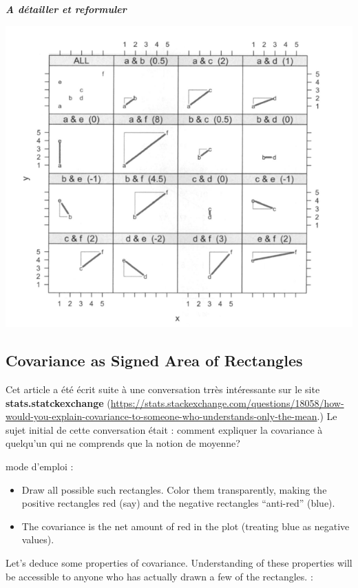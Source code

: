 \documentclass[
]{report}
\providecommand{\tightlist}{%
  \setlength{\itemsep}{0pt}\setlength{\parskip}{0pt}}
\begin{document}
\textbf{\emph{A détailler et reformuler}}

\includegraphics{hayes.PNG}

\hypertarget{covariance-as-signed-area-of-rectangles}{%
\subsection{Covariance as Signed Area of Rectangles}\label{covariance-as-signed-area-of-rectangles}}

Cet article \citep{chudzicki} a été écrit suite à une conversation trrès intéressante sur le site \textbf{stats.statckexchange} (\url{https://stats.stackexchange.com/questions/18058/how-would-you-explain-covariance-to-someone-who-understands-only-the-mean}.) Le sujet initial de cette conversation était : comment expliquer la covariance à quelqu'un qui ne comprends que la notion de moyenne?

mode d'emploi :

\begin{itemize}
\tightlist
\item
  Draw all possible such rectangles. Color them transparently, making the positive rectangles red (say) and the negative rectangles ``anti-red'' (blue).
\item
  The covariance is the net amount of red in the plot (treating blue as negative values).
\end{itemize}

Let's deduce some properties of covariance. Understanding of these properties will be accessible to anyone who has actually drawn a few of the rectangles. :
\end{document}

